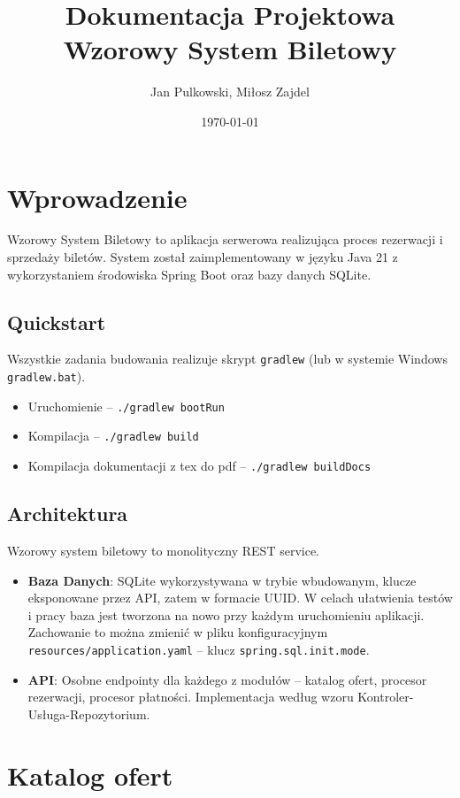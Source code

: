 \documentclass[11pt]{article}
\title{\textbf{Dokumentacja Projektowa}\\Wzorowy System Biletowy}
\author{Jan Pulkowski, Miłosz Zajdel}
\date{\today}
\begin{document}
\maketitle
\tableofcontents
\newpage

\section{Wprowadzenie}
Wzorowy System Biletowy to aplikacja serwerowa realizująca proces rezerwacji i sprzedaży biletów.
System został zaimplementowany w języku Java 21 z wykorzystaniem środowiska Spring Boot oraz bazy danych SQLite.

\subsection{Quickstart}
Wszystkie zadania budowania realizuje skrypt \texttt{gradlew} (lub w systemie Windows \texttt{gradlew.bat}).
\begin{itemize}
  \item Uruchomienie -- \texttt{./gradlew~bootRun}
  \item Kompilacja -- \texttt{./gradlew~build}
  \item Kompilacja dokumentacji z tex do pdf -- \texttt{./gradlew~buildDocs}
\end{itemize}

\subsection{Architektura}
Wzorowy system biletowy to monolityczny REST service.
\begin{itemize}
    \item \textbf{Baza Danych}: SQLite wykorzystywana w trybie wbudowanym, klucze eksponowane przez API, zatem w formacie UUID. W celach ułatwienia testów i pracy baza jest tworzona na nowo przy każdym uruchomieniu aplikacji.
    Zachowanie to można zmienić w pliku konfiguracyjnym \texttt{resources/application.yaml} -- klucz \texttt{spring.sql.init.mode}.
    \item \textbf{API}: Osobne endpointy dla każdego z modułów -- katalog ofert, procesor rezerwacji, procesor płatności. Implementacja według wzoru Kontroler-Usługa-Repozytorium.
\end{itemize}

\section{Katalog ofert}
\end{document}
